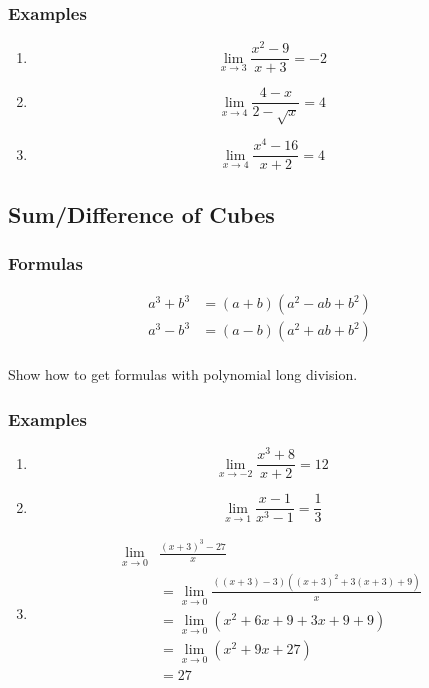 \documentclass[letterpaper, landscape]{exam}
\begin{document}
  \subsubsection{Examples}
  \begin{enumerate}
    \item 
      \[
        \lim_{x \to 3} \frac{x^2 - 9}{x + 3} = \boxed{ -2 }
      \]

    \item 
      \[
        \lim_{x \to 4} \frac{4 - x}{2 - \sqrt{x}} = \boxed{ 4 }
      \]

    \item 
      \[
        \lim_{x \to 4} \frac{x^4 - 16}{x + 2} = \boxed{ 4 }
      \]
  \end{enumerate}

  \subsection{Sum/Difference of Cubes}

  \subsubsection{Formulas}
  \begin{align*}
    a^3 + b^3 &= (a+b) \left(a^2-a b+b^2\right) \\
    a^3 - b^3 &= (a-b) \left(a^2+a b+b^2\right) \\
  \end{align*}

  Show how to get formulas with polynomial long division.

  \subsubsection{Examples}
  \begin{enumerate}
    \item 
      \[
        \lim_{x \to -2} \frac{x^3 + 8}{x + 2} = \boxed{ 12 }
      \]

    \item 
      \[
        \lim_{x \to 1} \frac{x - 1}{x^3 - 1} = \boxed{ \frac{1}{3} }
      \]

    \item 
      \begin{align*}
        \lim_{x \to 0} & \frac{(x + 3)^3 - 27}{x} \\
          & = \lim_{x \to 0} \frac{( (x + 3) - 3) \left( (x + 3)^2 +3(x + 3) + 9 \right)}{x} \\
          & = \lim_{x \to 0} \left( x^2 + 6x + 9 + 3x + 9 + 9 \right) \\
          & = \lim_{x \to 0} \left( x^2 + 9x + 27 \right) \\
          & = \boxed{ 27 } \\
          \\
      \end{align*}

  \end{enumerate}
\end{document}
